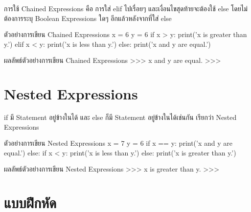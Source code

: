 การใช้ Chained Expressions คือ การใส่ elif ไปเรื่อยๆ และเงื่อนไขสุดท้ายจะต้องใช้ else โดยไม่ต้องการระบุ Boolean Expressions ใดๆ อีกแล้วหลังจากที่ใส่ else

\begin{codelist}{ตัวอย่างการเขียน Chained Expressions}{}
x = 6
y = 6
if x > y: print('x is greater than y.')
elif x < y: print('x is less than y.')
else: print('x and y are equal.')
\end{codelist}


\begin{codelist}{ผลลัพธ์ตัวอย่างการเขียน Chained Expressions}{}
>>>
x and y are equal.
>>>
\end{codelist}


\section{Nested Expressions}

if มี Statement อยู่ข้างในได้ และ else ก็มี Statement อยู่ข้างในได้เช่นกัน เรียกว่า Nested Expressions

\begin{codelist}{ตัวอย่างการเขียน Nested Expressions}{}
x = 7
y = 6
if x == y: print('x and y are equal.')
else:
    if x < y: print('x is less than y.')
    else: print('x is greater than y.')
\end{codelist}

\begin{codelist}{ผลลัพธ์ตัวอย่างการเขียน Nested Expressions}{}
>>>
x is greater than y.
>>>
\end{codelist}

\section{แบบฝึกหัด}

